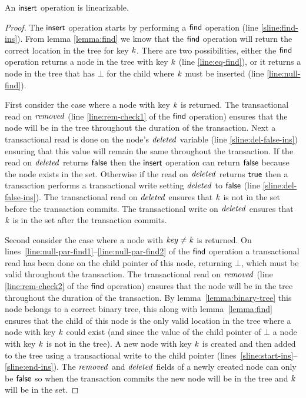 \begin{theorem}
\label{theorem:insert-valid2}
An $\act{insert}$ operation is linearizable.
\end{theorem}
\begin{proof}
The $\act{insert}$ operation starts by performing a $\act{find}$ operation (line \ref{sline:find-ins}).
From lemma \ref{lemma:find} we know that the $\act{find}$ operation will return the correct location in the tree for key $\ms{k}$.
There are two possibilities, either the $\act{find}$ operation returns a node in the tree with key $\ms{k}$ (line \ref{line:eq-find}),
or it returns a node in the tree that has $\bot$ for the child where $\ms{k}$ must be inserted (line \ref{line:null-find}).

First consider the case where a node with key $\ms{k}$ is returned.
The transactional read on $\ms{removed}$ (line \ref{line:rem-check1} of the $\act{find}$ operation) ensures that the node will be in the tree throughout the duration of the transaction.
Next a transactional read is done on the node's $\ms{deleted}$ variable (line \ref{sline:del-false-ins}) ensuring that this value will remain the same throughout the transaction.
If the read on $\ms{deleted}$ returns $\lit{false}$ then the $\act{insert}$ operation can return $\lit{false}$ because the node exists in the set.
Otherwise if the read on $\ms{deleted}$ returns $\lit{true}$ then a transaction performs a transactional write setting $\ms{deleted}$ to $\lit{false}$ (line \ref{sline:del-false-ins}).
The transactional read on $\ms{deleted}$ ensures that $\ms{k}$ is not in the set before the transaction commits.
The transactional write on $\ms{deleted}$ ensures that $\ms{k}$ is in the set after the transaction commits.

Second consider the case where a node with $\ms{key} \neq \ms{k}$ is returned.
On lines~\ref{line:null-par-find1}--\ref{line:null-par-find2} of the $\act{find}$ operation a transactional read has been done on the child pointer of this node, returning $\bot$, which must be valid throughout the transaction.
The transactional read on $\ms{removed}$ (line \ref{line:rem-check2} of the $\act{find}$ operation) ensures that the node will be in the tree throughout the duration of the transaction.
By lemma~\ref{lemma:binary-tree} this node belongs to a correct binary tree, this along with
lemma~\ref{lemma:find} ensures that the child of this node is the only valid location in the tree where a node with key $\ms{k}$ could exist
(and since the value of the child pointer of $\bot$ a node with key $\ms{k}$ is not in the tree).
A new node with key $\ms{k}$ is created and then added to the tree using a transactional write to the child pointer (lines~\ref{sline:start-ins}--\ref{sline:end-ins}).
The $\ms{removed}$ and $\ms{deleted}$ fields of a newly created node can only be $\lit{false}$ so when the transaction commits the new node will be in the tree and $\ms{k}$ will be in the set.
\end{proof}


